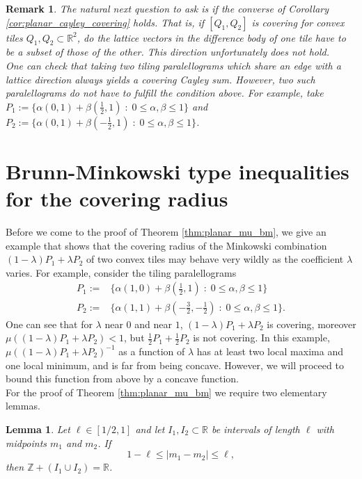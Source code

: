 \documentclass[11pt, a4paper]{amsart}
\newcommand{\RR}{\mathbb{R}}
\newcommand{\ZZ}{\mathbb{Z}}
\numberwithin{equation}{section}
\theoremstyle{plain}
\newtheorem{lemma}[theorem]{Lemma}
\newtheorem{remark}[theorem]{Remark}
\begin{document}
\begin{remark}
The natural next question to ask is if the converse of Corollary \ref{cor:planar_cayley_covering} holds. That is, if $[Q_1,Q_2]$ is covering for convex tiles $Q_1,Q_2\subset\RR^2$, do the lattice vectors in the difference body of one tile have to be a subset of those of the other. This direction unfortunately does not hold.\\
One can check that taking two tiling paralellograms which share an edge with a lattice direction always yields a covering Cayley sum. However, two such paralellograms do not have to fulfill the condition above. For example, take $P_1:=\{ \alpha (0,1)+\beta(\frac{1}{2}, 1)\; : \; 0\leq \alpha,\beta\leq 1\}$ and $P_2:=\{ \alpha (0,1)+\beta(-\frac{1}{2}, 1)\; : \; 0\leq \alpha,\beta\leq 1\}$. 
\end{remark}

\section{Brunn-Minkowski type inequalities for the covering radius}
\label{sec:bm}

Before we come to the proof of Theorem \ref{thm:planar_mu_bm}, we give an example that shows that the covering radius of the Minkowski combination $(1-\lambda)P_1+\lambda P_2$ of two convex tiles may behave very wildly as the coefficient $\lambda$ varies. For example, consider the tiling paralellograms
\begin{align*}
	P_1:=&\{ \alpha (1,0)+\beta (\frac{1}{2},1)\; : \; 0\leq \alpha,\beta\leq 1\} \\
	P_2:=&\{ \alpha (1,1)+\beta (-\frac{3}{2},-\frac{1}{2})\; : \; 0\leq \alpha,\beta\leq 1\}. 
\end{align*}
One can see that for $\lambda$ near $0$ and near $1$, $(1-\lambda)P_1+\lambda P_2$ is covering, moreover $\mu((1-\lambda)P_1+\lambda P_2)<1$, but $\frac{1}{2}P_1+\frac{1}{2}P_2$ is not covering. In this example, $\mu((1-\lambda)P_1+\lambda P_2)^{-1}$ as a function of $\lambda$ has at least two local maxima and one local minimum, and is far from being concave. However, we will proceed to bound this function from above by a concave function.\\


For the proof of Theorem \ref{thm:planar_mu_bm} we require two elementary lemmas.

\begin{lemma}
\label{lem:triang_union}
Let $\ell\in[1/2,1]$ and let $I_1,I_2\subset\RR$ be intervals of length $\ell$ with midpoints $m_1$ and $m_2$. If
\[
1-\ell \leq |m_1-m_2|\leq \ell,
\]
then $\ZZ + (I_1\cup I_2) = \RR$.
\end{lemma}
\end{document}
